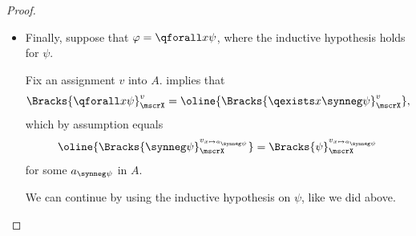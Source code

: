 \begin{proof}
\begin{itemize}
    Fix an assignment \( v \) into \( A \).
    \begin{itemize}
      \item If \( \Bracks{\qexists x \psi}_\mscrX^v = \semtop \), by assumption there exists an element \( a_\psi \) in \( A \) such that
      \begin{equation*}
        \underbrace{\Bracks{\qexists x \psi}_\mscrX^v}_{\semtop} = \Bracks{\psi}_\mscrX^{v_{x \mapsto a_\psi}}.
      \end{equation*}

      By the inductive hypothesis, we have \( \Bracks{\psi}_\mscrA^{v_{x \mapsto a_\psi}} = \semtop \), so
      \begin{equation*}
        \Bracks{\qexists x \psi}_\mscrX^v = \bigvee \set[\big]{ \Bracks{\psi}_\mscrA^{v_{x \mapsto a}} \given a \in A } = \semtop.
      \end{equation*}

      \item Otherwise, \( \Bracks{\qexists x \psi}_\mscrX^v = \sembot \), so \( \Bracks{\psi}_\mscrX^{v_{x \mapsto a_\psi}} = \sembot \) for every \( a \) in \( X \), and in particular every \( a \) in \( A \).

      By the inductive hypothesis, we have \( \Bracks{\psi}_\mscrA^{v_{x \mapsto a_\psi}} = \sembot \), so \( \Bracks{\qexists x \psi}_\mscrX^v = \sembot \).
    \end{itemize}

    \item Finally, suppose that \( \varphi = \qforall x \psi \), where the inductive hypothesis holds for \( \psi \).

    Fix an assignment \( v \) into \( A \).  implies that
    \begin{equation*}
      \Bracks{\qforall x \psi}_\mscrX^v = \oline {\Bracks{\qexists x \synneg \psi}_\mscrX^v},
    \end{equation*}
    which by assumption equals
    \begin{equation*}
      \oline{\Bracks{\synneg \psi}_\mscrX^{v_{x \mapsto a_{\synneg \psi}}}}
      =
      \Bracks{\psi}_\mscrX^{v_{x \mapsto a_{\synneg \psi}}}
    \end{equation*}
    for some \( a_{\synneg \psi} \) in \( A \).

    We can continue by using the inductive hypothesis on \( \psi \), like we did above.
  \end{itemize}
\end{proof}

